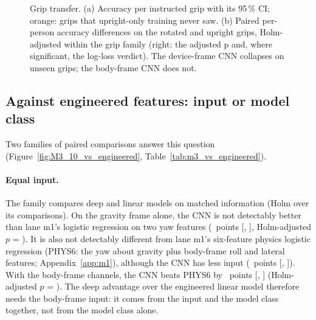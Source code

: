 \begin{figure}[tbp]
  \centering
  \caption{Grip transfer. (a) Accuracy per instructed grip with its 95\,\% CI; orange: grips that upright-only training never saw. (b) Paired per-person accuracy differences on the rotated and upright grips, Holm-adjusted within the grip family (right: the adjusted p and, where significant, the log-loss verdict). The device-frame CNN collapses on unseen grips; the body-frame CNN does not.}
  \label{fig:M3_09_grip_transfer}\label{fig:app:m3-grip}
\end{figure}


\subsection{Against engineered features: input or model class}\label{app:m3:engineered}

Two families of paired comparisons answer this question (Figure~\ref{fig:M3_10_vs_engineered}, Table~\ref{tab:m3_vs_engineered}).

\paragraph{Equal input.}
The family  compares deep and linear models on matched information (Holm over its  comparisons).
On the gravity frame alone, the CNN is not detectably better than lane m1's logistic regression on two yaw features (~points [, ], Holm-adjusted $p$ = ).
It is also not detectably different from lane m1's six-feature physics logistic regression (PHYS6: the yaw about gravity plus body-frame roll and lateral features; Appendix~\ref{app:m1}), although the CNN has less input (~points [, ]).
With the body-frame channels, the CNN beats PHYS6 by ~points [, ] (Holm-adjusted $p$ = ).
The deep advantage over the engineered linear model therefore needs the body-frame input: it comes from the input and the model class together, not from the model class alone.

